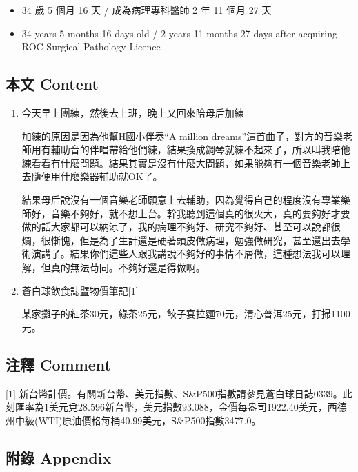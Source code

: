 \documentclass[
]{article}
\providecommand{\tightlist}{%
  \setlength{\itemsep}{0pt}\setlength{\parskip}{0pt}}
\begin{document}
\begin{itemize}
\tightlist
\item
  34 歲 5 個月 16 天 / 成為病理專科醫師 2 年 11 個月 27 天
\item
  34 years 5 months 16 days old / 2 years 11 months 27 days after
  acquiring ROC Surgical Pathology Licence
\end{itemize}

\hypertarget{ux672cux6587-content-36}{%
\subsection{本文 Content}\label{ux672cux6587-content-36}}

\begin{enumerate}
\def\labelenumi{\arabic{enumi}.}
\item
  今天早上團練，然後去上班，晚上又回來陪母后加練

  加練的原因是因為他幫H國小伴奏``A million
  dreams''這首曲子，對方的音樂老師用有輔助音的伴唱帶給他們練，結果換成鋼琴就練不起來了，所以叫我陪他練看看有什麼問題。結果其實是沒有什麼大問題，如果能夠有一個音樂老師上去隨便用什麼樂器輔助就OK了。

  結果母后說沒有一個音樂老師願意上去輔助，因為覺得自己的程度沒有專業樂師好，音樂不夠好，就不想上台。幹我聽到這個真的很火大，真的要夠好才要做的話大家都可以納涼了，我的病理不夠好、研究不夠好、甚至可以說都很爛，很慚愧，但是為了生計還是硬著頭皮做病理，勉強做研究，甚至還出去學術演講了。結果你們這些人跟我講說不夠好的事情不屑做，這種想法我可以理解，但真的無法苟同。不夠好還是得做啊。
\item
  蒼白球飲食誌暨物價筆記{[}1{]}

  某家攤子的紅茶30元，綠茶25元，餃子宴拉麵70元，清心普洱25元，打掃1100元。
\end{enumerate}

\hypertarget{ux6ce8ux91cb-comment-36}{%
\subsection{注釋 Comment}\label{ux6ce8ux91cb-comment-36}}

{[}1{]}
新台幣計價。有關新台幣、美元指數、S\&P500指數請參見蒼白球日誌0339。此刻匯率為1美元兌28.596新台幣，美元指數93.088，金價每盎司1922.40美元，西德州中級(WTI)原油價格每桶40.99美元，S\&P500指數3477.0。

\hypertarget{ux9644ux9304-appendix-36}{%
\subsection{附錄 Appendix}\label{ux9644ux9304-appendix-36}}
\end{document}

